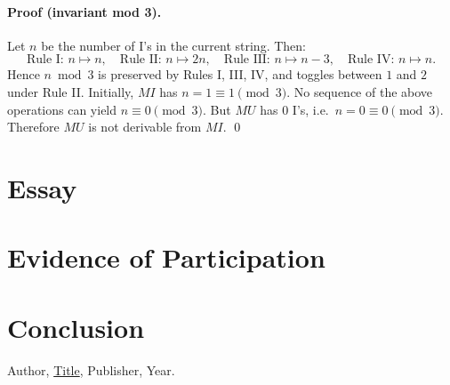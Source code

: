 \documentclass{article}
\theoremstyle{theorem}
\theoremstyle{definition}
\theoremstyle{remark}
\begin{document}
\paragraph{Proof (invariant mod 3).}
Let $n$ be the number of I’s in the current string. Then:
\[
\text{Rule I: } n\mapsto n,\quad
\text{Rule II: } n\mapsto 2n,\quad
\text{Rule III: } n\mapsto n-3,\quad
\text{Rule IV: } n\mapsto n.
\]
Hence $n\bmod 3$ is preserved by Rules I, III, IV, and toggles between $1$ and $2$ under Rule II.
Initially, $MI$ has $n=1\equiv 1\pmod 3$. No sequence of the above operations can yield $n\equiv 0\pmod 3$.
But $MU$ has $0$ I’s, i.e.\ $n=0\equiv 0\pmod 3$. Therefore $MU$ is not derivable from $MI$.
\qed



\section{Essay}

\section{Evidence of Participation}

\section{Conclusion}\label{conclusion}

\begin{thebibliography}{99}
 Author, \href{https://en.wikipedia.org/wiki/LaTeX}{Title}, Publisher, Year.
\end{thebibliography}
\end{document}
